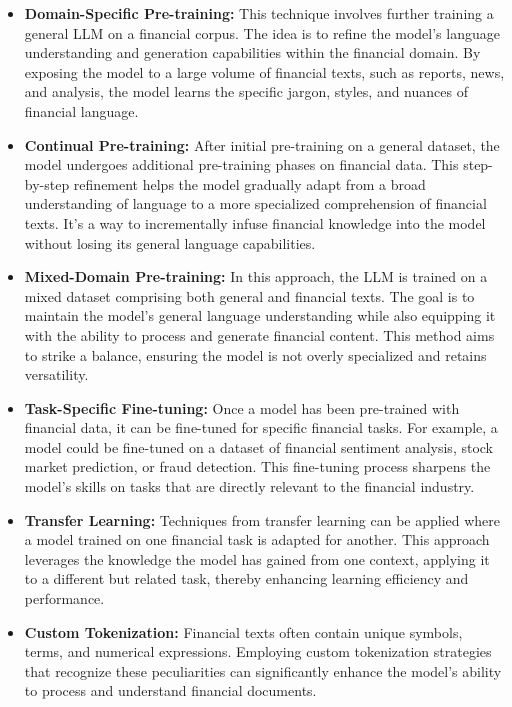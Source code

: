 \begin{itemize}
	\item \textbf{Domain-Specific Pre-training:}{
		      This technique involves further training a general LLM on a financial corpus. The idea is to refine the model's language understanding and generation capabilities within the financial domain. By exposing the model to a large volume of financial texts, such as reports, news, and analysis, the model learns the specific jargon, styles, and nuances of financial language.
	      }

	\item \textbf{Continual Pre-training:}{
		      After initial pre-training on a general dataset, the model undergoes additional pre-training phases on financial data. This step-by-step refinement helps the model gradually adapt from a broad understanding of language to a more specialized comprehension of financial texts. It's a way to incrementally infuse financial knowledge into the model without losing its general language capabilities.
	      }

	\item \textbf{Mixed-Domain Pre-training:}{
		      In this approach, the LLM is trained on a mixed dataset comprising both general and financial texts. The goal is to maintain the model's general language understanding while also equipping it with the ability to process and generate financial content. This method aims to strike a balance, ensuring the model is not overly specialized and retains versatility.
	      }

	\item \textbf{Task-Specific Fine-tuning:}{
		      Once a model has been pre-trained with financial data, it can be fine-tuned for specific financial tasks. For example, a model could be fine-tuned on a dataset of financial sentiment analysis, stock market prediction, or fraud detection. This fine-tuning process sharpens the model's skills on tasks that are directly relevant to the financial industry.
	      }

	\item \textbf{Transfer Learning:}{
		      Techniques from transfer learning can be applied where a model trained on one financial task is adapted for another. This approach leverages the knowledge the model has gained from one context, applying it to a different but related task, thereby enhancing learning efficiency and performance.
	      }

	\item \textbf{Custom Tokenization:}{
		      Financial texts often contain unique symbols, terms, and numerical expressions. Employing custom tokenization strategies that recognize these peculiarities can significantly enhance the model's ability to process and understand financial documents.
	      }
\end{itemize}

